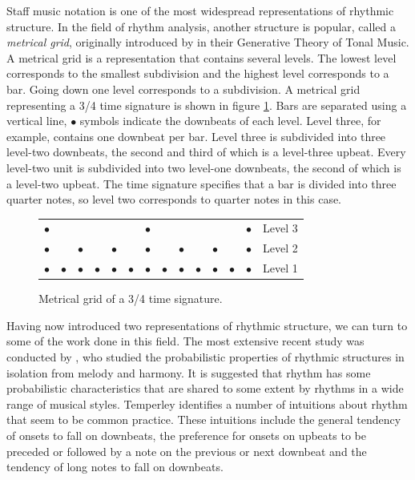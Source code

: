 Staff music notation is one of the most widespread representations of rhythmic structure. In the field of rhythm analysis, another structure is popular, called a \textit{metrical grid}, originally introduced by \citet{lerdahl1983generative} in their Generative Theory of Tonal Music. A metrical grid is a representation that contains several levels. The lowest level corresponds to the smallest subdivision and the highest level corresponds to a bar. Going down one level corresponds to a subdivision. A metrical grid representing a 3/4 time signature is shown in figure \ref{fig:grid}. Bars are separated using a vertical line, $\bullet$ symbols indicate the downbeats of each level. Level three, for example, contains one downbeat per bar. Level three is subdivided into three level-two downbeats, the second and third of which is a level-three upbeat. Every level-two unit is subdivided into two level-one downbeats, the second of which is a level-two upbeat. The time signature specifies that a bar is divided into three quarter notes, so level two corresponds to quarter notes in this case.

\begin{figure}[t]
\centering
\hspace{2in}
\setlength{\extrarowheight}{-10.5pt}
\begin{tabular}{llllll|llllll|ll}
$\bullet$ &  &  &  &  &  & 		$\bullet$ &  &  &  &  &  & $\bullet$ & Level 3\\ 
$\bullet$ &  & 	$\bullet$ &  & 	$\bullet$ & & 	$\bullet$ & & $\bullet$ &  & $\bullet$ &  & $\bullet$ & Level 2\\
$\bullet$ & 		$\bullet$ & 		$\bullet$ & 		$\bullet$ & $\bullet$ & $\bullet$ & $\bullet$ & $\bullet$ & $\bullet$ & $\bullet$ & $\bullet$ & $\bullet$ & $\bullet$ & Level 1\\
\end{tabular}
\caption{Metrical grid of a 3/4 time signature.}
\label{fig:grid}
\end{figure}

Having now introduced two representations of rhythmic structure, we can turn to some of the work done in this field. The most extensive recent study was conducted by \cite{temperley2010modeling}, who studied the probabilistic properties of rhythmic structures in isolation from melody and harmony. It is suggested that rhythm has some probabilistic characteristics that are shared to some extent by rhythms in a wide range of musical styles. Temperley identifies a number of intuitions about rhythm that seem to be common practice. These intuitions include the general tendency of onsets to fall on downbeats, the preference for onsets on upbeats to be preceded or followed by a note on the previous or next downbeat and the tendency of long notes to fall on downbeats. 


